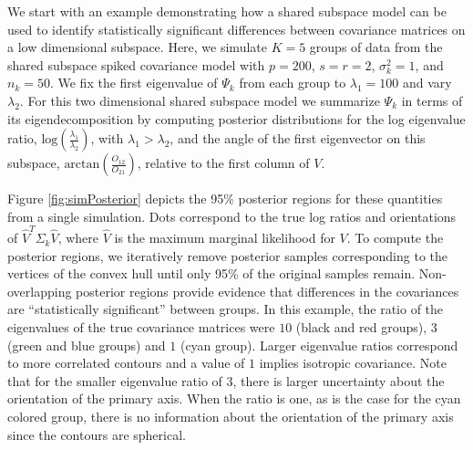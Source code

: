 \documentclass[12pt]{article}
\begin{document}

We start with an example demonstrating how a shared subspace
model can be used to identify statistically significant differences between
covariance matrices on a low dimensional subspace. Here, we simulate
$K=5$ groups of data from the shared subspace spiked covariance
model with $p=200$, $s=r=2$, $\sigma_k^2=1$, and
$n_k=50$.  We fix the first eigenvalue of $\Psi_k$ from each group to
$\lambda_1=100$ and vary $\lambda_2$.  For this two dimensional shared subspace
model we summarize $\Psi_k$ in terms of its eigendecomposition by
computing posterior distributions for the log eigenvalue ratio,
$\text{log}(\frac{\lambda_1}{\lambda_2})$, with $\lambda_1 > \lambda_2$, and the
angle of the first eigenvector on this subspace,
$\text{arctan}(\frac{O_{12}}{O_{21}})$, relative to the first column
of $V$.

Figure \ref{fig:simPosterior} depicts the 95\% posterior regions for
these quantities from a single simulation.  Dots correspond to the
true log ratios and orientations of $\hat{V}^T\Sigma_k\hat{V}$, where
$\hat{V}$ is the maximum marginal likelihood for $V$. To compute the
posterior regions, we iteratively remove posterior samples
corresponding to the vertices of the convex hull until only 95\% of
the original samples remain.  Non-overlapping posterior regions
provide evidence that differences in the covariances are
``statistically significant'' between groups.  In this example, the
ratio of the eigenvalues of the true covariance matrices were $10$
(black and red groups), $3$ (green and blue groups) and $1$ (cyan
group).  Larger eigenvalue ratios correspond to more correlated
contours and a value of $1$ implies isotropic covariance.  Note that
for the smaller eigenvalue ratio of $3$, there is larger uncertainty
about the orientation of the primary axis.  When the ratio is one, as
is the case for the cyan colored group, there is no information about
the orientation of the primary axis since the contours are spherical.
\end{document}
